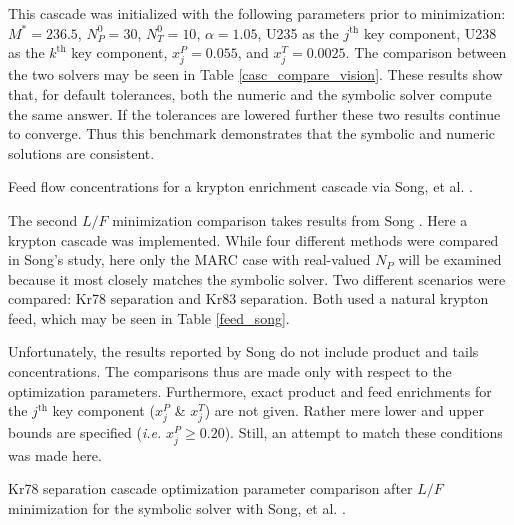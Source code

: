 \documentclass[preprint,12pt]{elsarticle}
\newcommand{\nuc}[2]{{#1}{#2}}
\newcommand{\jth}[0]{$j^{\mbox{th}}$ }
\newcommand{\kth}[0]{$k^{\mbox{th}}$ }
\begin{document}
This cascade was initialized with the following parameters prior to minimization: 
$M^*=236.5$, $N_P^0=30$, $N_T^0=10$, $\alpha=1.05$, \nuc{U}{235} as the \jth key 
component, \nuc{U}{238} as the \kth key component, $x_j^P=0.055$, and 
$x_j^T=0.0025$.  The comparison between the two solvers may be seen in Table
\ref{casc_compare_vision}.  These results show that, for default tolerances,
both the numeric and the symbolic solver compute the same answer. 
If the tolerances are lowered further these two results continue to converge.  
Thus this benchmark demonstrates that the symbolic and numeric solutions
are consistent.

\begin{table}[htbp]
\begin{center}
\caption{Feed flow concentrations for a krypton enrichment cascade via  
    Song, et al. \cite{doi:10.1080/01496391003793884}.}

\label{feed_song}
\end{center}
\end{table}

The second $L/F$ minimization comparison takes results from Song 
\cite{doi:10.1080/01496391003793884}.  Here a krypton
cascade was implemented.  While four different methods were compared in Song's study, 
here only the MARC case with real-valued $N_P$  will be examined because
it most closely matches the symbolic solver.  Two different scenarios were
compared: \nuc{Kr}{78} separation and \nuc{Kr}{83} separation.  Both used a 
natural krypton feed, which may be seen in Table \ref{feed_song}.

Unfortunately, the results reported by Song do not include product and tails 
concentrations.  The comparisons thus are made only with respect to 
the optimization parameters.  Furthermore, exact product and feed enrichments
for the \jth key component
($x_j^P$ \& $x_j^T$) are not given. Rather mere lower and upper bounds are specified
(\emph{i.e.} $x_j^P\ge0.20$).
Still, an attempt to match these conditions was made here.

\begin{table}[htbp]
\begin{center}
\caption{\nuc{Kr}{78} separation cascade optimization parameter comparison after 
    $L/F$ minimization for the symbolic 
    solver with Song, et al. \cite{doi:10.1080/01496391003793884}.}

\label{casc_compare_song1}
\end{center}
\end{table}
\end{document}
